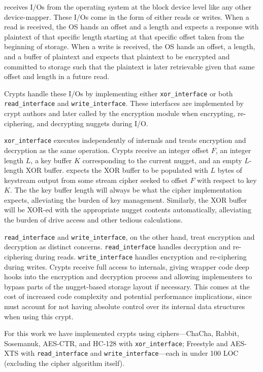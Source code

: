 \sys receives I/Os from the operating system at the block device level like any
other device-mapper. These I/Os come in the form of either reads or writes. When
a read is received, the OS hands \sys an offset and a length and expects a
response with plaintext of that specific length starting at that specific offset
taken from the beginning of storage. When a write is received, the OS hands \sys
an offset, a length, and a buffer of plaintext and expects that plaintext to be
encrypted and committed to storage such that the plaintext is later retrievable
given that same offset and length in a future read.

Crypts handle these I/Os by implementing either \texttt{xor\_interface} or both
\texttt{read\_interface} and \texttt{write\_interface}. These interfaces are
implemented by crypt authors and later called by the encryption module when
encrypting, re-ciphering, and decrypting nuggets during I/O.


\texttt{xor\_interface} executes independently of \sys internals and treats
encryption and decryption as the same operation. Crypts receive an integer
offset $F$, an integer length $L$, a key buffer $K$ corresponding to the current
nugget, and an empty $L$-length XOR buffer. \sys expects the XOR buffer to be
populated with $L$ bytes of keystream output from some stream cipher seeked to
offset $F$ with respect to key $K$. The the key buffer length will always be
what the cipher implementation expects, alleviating the burden of key
management. Similarly, the XOR buffer will be XOR-ed with the appropriate
nugget contents automatically, alleviating the burden of drive access
and other tedious calculations.


\texttt{read\_interface} and \texttt{write\_interface}, on the other hand, treat
encryption and decryption as distinct concerns. \texttt{read\_interface} handles
decryption and re-ciphering during reads. \texttt{write\_interface} handles
encryption and re-ciphering during writes. Crypts receive full access to \sys
internals, giving wrapper code deep hooks into the encryption and decryption
process and allowing implementers to bypass parts of the nugget-based storage
layout if necessary. This comes at the cost of increased code complexity and
potential performance implications, since \sys must account for not having
absolute control over its internal data structures when using this crypt.

For this work we have implemented \numConfigs crypts using \numCiphers
ciphers---ChaCha, Rabbit, Sosemanuk, AES-CTR, and HC-128 with
\texttt{xor\_interface}; Freestyle and AES-XTS with \texttt{read\_interface} and
\texttt{write\_interface}---each in under 100 LOC (excluding the cipher
algorithm itself).

